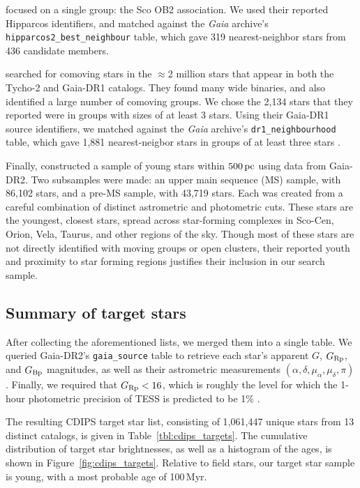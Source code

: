\documentclass[12pt,twocolumn,tighten]{aastex62}
\begin{document}
\citet{rizzuto_multidimensional_2011} focused on a single group: the
Sco OB2 association. We used their reported Hipparcos identifiers, and
matched against the {\it Gaia} archive's
\texttt{hipparcos2\_best\_neighbour} table, which gave 319
nearest-neighbor stars from 436 candidate members.

\citet{oh_comoving_2017} searched for comoving stars in the $\approx$2
million stars that appear in both the Tycho-2 and Gaia-DR1
catalogs.  They found many wide binaries, and also identified a large
number of comoving groups.  We chose the 2{,}134 stars that they
reported were in groups with sizes of at least 3 stars.  Using their
Gaia-DR1 source identifiers, we matched against the {\it Gaia}
archive's \texttt{dr1\_neighbourhood} table, which gave 1{,}881
nearest-neigbor stars in groups of at least three stars
\citep{marrese_gaia_2019}.

Finally, \citet{zari_3d_2018} constructed a sample of young stars
within $500\,{\rm pc}$ using data from Gaia-DR2. Two subsamples were
made: an upper main sequence (MS) sample, with 86{,}102 stars, and
a pre-MS sample, with 43{,}719 stars.  Each was created from a
careful combination of distinct astrometric and photometric cuts.
These stars are the youngest, closest stars, spread across
star-forming complexes in Sco-Cen, Orion, Vela, Taurus, and other
regions of the sky.  Though most of these stars are not directly
identified with moving groups or open clusters, their reported youth
and proximity to star forming regions justifies their inclusion in our
search sample.



\subsection{Summary of target stars}
\label{subsec:ocmgsummary}


After collecting the aforementioned lists, we merged them into a
single table. We queried Gaia-DR2's \texttt{gaia\_source} table to
retrieve each star's apparent $G$, $G_{\rm Rp}$, and $G_{\rm Bp}$
magnitudes, as well as their astrometric measurements $(\alpha,
\delta, \mu_\alpha, \mu_\delta, \pi)$.  Finally, we required that
$G_{\rm Rp} < 16$, which is roughly the level for which the 1-hour
photometric precision of TESS is predicted to be 1\%
\citep{ricker_transiting_2015}.

The resulting CDIPS target star list, consisting of 1{,}061{,}447
unique stars from 13 distinct catalogs, is given in
Table~\ref{tbl:cdips_targets}.  The cumulative distribution of target
star brightnesses, as well as a histogram of the ages, is shown in
Figure~\ref{fig:cdips_targets}.  Relative to field stars, our target
star sample is young, with a most probable age of 100$\,$Myr.
\end{document}
